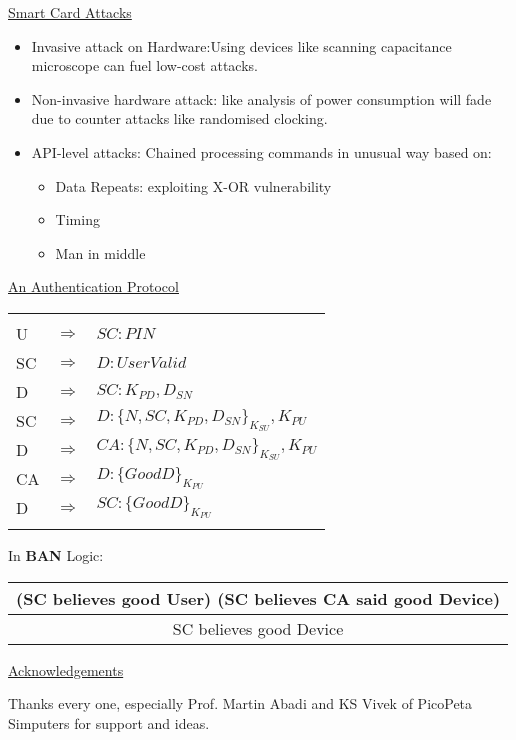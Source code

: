 \documentclass{slides}
\begin{document}
\begin{slide}
\begin{center}
\underline{Smart Card Attacks}
\end{center}
\small
\begin{itemize}
\item Invasive attack on Hardware:Using devices like scanning capacitance microscope can fuel low-cost attacks.
\item Non-invasive hardware attack: like analysis of power consumption will fade due to counter attacks like randomised clocking.
\item API-level attacks: Chained processing commands in unusual way based on:
\begin{itemize}
\item Data Repeats: exploiting X-OR vulnerability
\item Timing
\item Man in middle
\end{itemize}
\end{itemize}
\end{slide}

\begin{slide}
\begin{center}
\underline{An Authentication Protocol}
\end{center}

\begin{center}
\begin{tabular}{|lll|}
\hline
 & & \\
U & $\Rightarrow $ & $ SC: PIN $ \\
SC & $\Rightarrow $ & $ D: User Valid $\\
D & $\Rightarrow $ & $ SC: K_{PD}, D_{SN}$ \\
SC & $\Rightarrow $ &  $ D: \{N, SC, K_{PD}, D_{SN}\}_{K_{SU}}, K_{PU}$ \\
D & $\Rightarrow $ & $ CA: \{N, SC, K_{PD}, D_{SN}\}_{K_{SU}}, K_{PU}$ \\
CA & $\Rightarrow $ & $ D: \{Good D\}_{K_{PU}}$ \\
D & $\Rightarrow $ & $ SC: \{Good D\}_{K_{PU}}$ \\
 & & \\
\hline
\end{tabular}
\end{center}

In {\bf BAN} Logic:
\begin{center}
\small
\begin{tabular}{c}
(SC believes good User) (SC believes CA said good Device)\\
\hline
SC believes good Device \\
\end{tabular}
\end{center}
\end{slide}

\begin{slide}
\begin{center}
\underline{Acknowledgements}
\end{center}
Thanks every one, especially Prof. Martin Abadi and KS Vivek of PicoPeta Simputers for support and ideas.
\end{slide}
\end{document}
